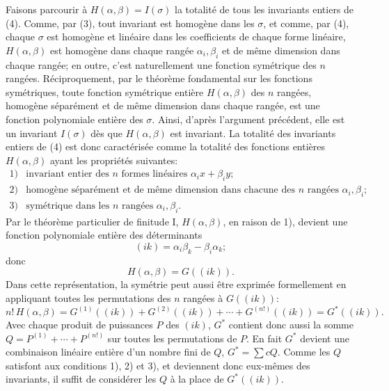 Faisons parcourir à $H(\alpha,\beta)=I(\sigma)$ la totalité de tous les invariants entiers de (4). Comme, par (3), tout invariant est homogène dans les $\sigma$, et comme, par (4), chaque $\sigma$ est homogène et linéaire dans les coefficients de chaque forme linéaire, $H(\alpha,\beta)$ est homogène dans chaque rangée $\alpha_i,\beta_i$ et de même dimension dans chaque rangée; en outre, c'est naturellement une fonction symétrique des $n$ rangées. Réciproquement, par le théorème fondamental sur les fonctions symétriques, toute fonction symétrique entière $H(\alpha,\beta)$ des $n$ rangées, homogène séparément et de même dimension dans chaque rangée, est une fonction polynomiale entière des $\sigma$. Ainsi, d'après l'argument précédent, elle est un invariant $I(\sigma)$ dès que $H(\alpha,\beta)$ est invariant. La totalité des invariants entiers de (4) est donc caractérisée comme la totalité des fonctions entières $H(\alpha,\beta)$ ayant les propriétés suivantes:
\[
\begin{array}{ll}
1) & \text{invariant entier des $n$ formes linéaires $\alpha_i x+\beta_i y$;}\\
2) & \text{homogène séparément et de même dimension dans chacune des $n$ rangées $\alpha_i,\beta_i$;}\\
3) & \text{symétrique dans les $n$ rangées $\alpha_i,\beta_i$.}
\end{array}
\]
Par le théorème particulier de finitude I, $H(\alpha,\beta)$, en raison de 1), devient une fonction polynomiale entière des déterminants
\[
        (ik)=\alpha_i\beta_k-\beta_i\alpha_k;
\]
donc
\[
        H(\alpha,\beta)=G((ik)).
\]
Dans cette représentation, la symétrie peut aussi être exprimée formellement en appliquant toutes les permutations des $n$ rangées à $G((ik))$:
\begin{equation}
        n!\,H(\alpha,\beta)
        =
        G^{(1)}((ik))+G^{(2)}((ik))+\cdots+G^{(n!)}((ik))
        =G^*((ik)).
\end{equation}
Avec chaque produit de puissances $P$ des $(ik)$, $G^*$ contient donc aussi la somme $Q=P^{(1)}+\cdots+P^{(n!)}$ sur toutes les permutations de $P$. En fait $G^*$ devient une combinaison linéaire entière d'un nombre fini de $Q$, $G^*=\sum cQ$. Comme les $Q$ satisfont aux conditions 1), 2) et 3), et deviennent donc eux-mêmes des invariants, il suffit de considérer les $Q$ à la place de $G^*((ik))$.

